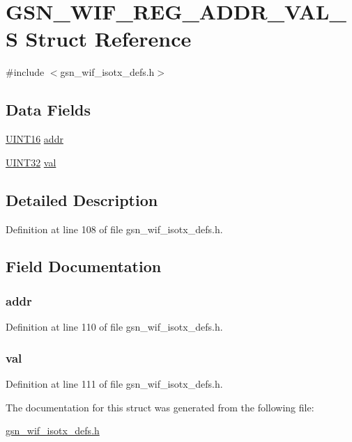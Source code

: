 \hypertarget{a00343}{
\section{GSN\_\-WIF\_\-REG\_\-ADDR\_\-VAL\_\-S Struct Reference}
\label{a00343}
}


{\ttfamily \#include $<$gsn\_\-wif\_\-isotx\_\-defs.h$>$}

\subsection*{Data Fields}
\begin{DoxyCompactItemize}
\item 
\hyperlink{a00660_ga09f1a1fb2293e33483cc8d44aefb1eb1}{UINT16} \hyperlink{a00343_aa85b1d266c8260e937fcbe7f1794caa3}{addr}
\item 
\hyperlink{a00660_gae1e6edbbc26d6fbc71a90190d0266018}{UINT32} \hyperlink{a00343_a54d851e570e606ab36dbbae21f7f0095}{val}
\end{DoxyCompactItemize}


\subsection{Detailed Description}


Definition at line 108 of file gsn\_\-wif\_\-isotx\_\-defs.h.



\subsection{Field Documentation}
\hypertarget{a00343_aa85b1d266c8260e937fcbe7f1794caa3}{
\subsubsection[{addr}]{ {\bf addr}}}
\label{a00343_aa85b1d266c8260e937fcbe7f1794caa3}


Definition at line 110 of file gsn\_\-wif\_\-isotx\_\-defs.h.

\hypertarget{a00343_a54d851e570e606ab36dbbae21f7f0095}{
\subsubsection[{val}]{ {\bf val}}}
\label{a00343_a54d851e570e606ab36dbbae21f7f0095}


Definition at line 111 of file gsn\_\-wif\_\-isotx\_\-defs.h.



The documentation for this struct was generated from the following file:\begin{DoxyCompactItemize}
\item 
\hyperlink{a00611}{gsn\_\-wif\_\-isotx\_\-defs.h}\end{DoxyCompactItemize}
